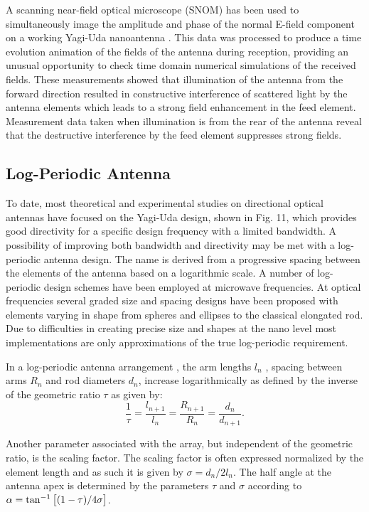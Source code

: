 \documentclass[11pt]{article}
\begin{document}
A scanning near-field optical microscope (SNOM) has been used to simultaneously image the amplitude and phase of the normal E-field component on a working Yagi-Uda nanoantenna \cite{Dorfmuller2011}. This data was processed to produce a time evolution animation of the fields of the antenna during reception, providing an unusual opportunity to check time domain numerical simulations of the received fields. These measurements showed that illumination of the antenna from the forward direction resulted in constructive interference of scattered light by the antenna elements which leads to a strong field enhancement in the feed element. Measurement data taken when illumination is from the rear of the antenna reveal that the destructive interference by the feed element suppresses strong fields.
\subsection{Log-Periodic Antenna}
%
To date, most theoretical and experimental studies on directional optical antennas have focused on the Yagi-Uda design, shown in Fig. 11, which provides good directivity for a specific design frequency with a limited bandwidth. A possibility of improving both bandwidth and directivity may be met with a log-periodic antenna design. The name is derived from a progressive spacing between the elements of the antenna based on a logarithmic scale. A number of log-periodic design schemes have been employed at microwave frequencies. At optical frequencies several graded size and spacing designs have been proposed with elements varying in shape from spheres and ellipses to the classical elongated rod. Due to difficulties in creating precise size and shapes at the nano level most implementations are only approximations of the true log-periodic requirement.

In a log-periodic antenna arrangement \cite{Balanis2015}, the arm lengths $l_n$ , spacing between arms $R_n$ and rod diameters $d_n$, increase logarithmically as defined by the inverse of the geometric ratio  $\tau$ as given by:
%
\begin{equation}
  \frac{1}{\tau} = \frac{l_{n + 1}}{l_n} = \frac{R_{n + 1}}{R_n} = \frac{d_n}{d_{n + 1}}.
  \label{eq:logperiodic}
\end{equation}

Another parameter associated with the array, but independent of the geometric ratio, is the scaling factor. The scaling factor is often expressed normalized by the element length and as such it is given by $\sigma  = d_n/ {2 l_n}$. The half angle at the antenna apex is determined by the parameters $\tau$ and $\sigma$ according to $\alpha  = \tan ^{-1}\left[(1 - \tau)/{4 \sigma} \right]$.
\end{document}
